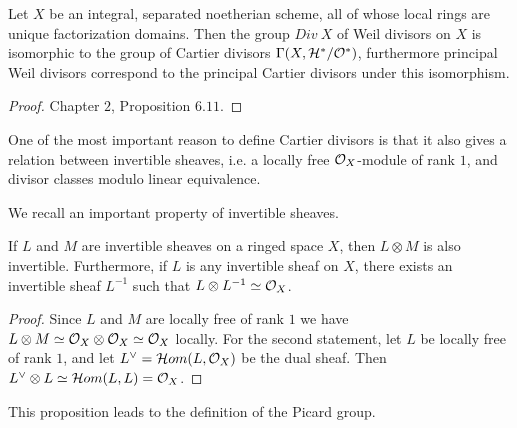 \documentclass[
	oldfontcommands,
	sumario=abnt-6027-2012,
	12pt,			%
	openright,		%
	oneside,		%
	a4paper,		%
	english,		%
	brazil			%
	]{imecc-unicamp}
\begin{document}
\begin{proposition}
	Let $X$ be an integral, separated noetherian scheme, all of whose local rings are unique factorization domains. Then the group $Div~X$ of Weil divisors on $X$ is isomorphic to the group of Cartier divisors $\Gamma(X,\mathcal H^*/{\mathcal O}^*)$, furthermore principal Weil divisors correspond to the principal Cartier divisors under this isomorphism.	
\end{proposition}
\begin{proof}
	\cite{hartshorne1977algebraic} Chapter $2$, Proposition $6.11$.
\end{proof}

One of the most important reason to define Cartier divisors is that it also gives a relation between invertible sheaves, i.e. a locally free ${\mathcal O}_X$-module of rank $1$, and divisor classes modulo linear equivalence.

We recall an important property of invertible sheaves.
\begin{proposition}
	If $ L$ and $ M$ are invertible sheaves on a ringed space $X$, then $L\otimes M$ is also invertible. Furthermore, if $L$ is any invertible sheaf on $X$, there exists an invertible sheaf $L^{-1}$ such that $L\otimes L^{-1}\simeq{\mathcal O}_X$.
\end{proposition}
\begin{proof}
	Since $L$ and $M$ are locally free of rank $1$ we have $L\otimes M\simeq {\mathcal O}_X\otimes{\mathcal O}_X\simeq{\mathcal O}_X$ locally. For the second statement, let $L$ be locally free of rank $1$, and let $L^\vee=\mathcal Hom(L,{\mathcal O}_X)$ be the dual sheaf. Then $L^\vee\otimes L\simeq\mathcal Hom (L,L)=\mathcal {{\mathcal O}}_X$. 
\end{proof}
This proposition leads to the definition of the Picard group.
\end{document}
